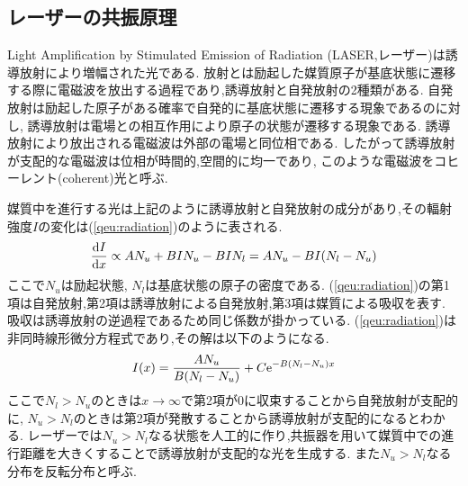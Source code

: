 \subsection{レーザーの共振原理}
Light Amplification by Stimulated Emission of Radiation (LASER,レーザー)は誘導放射により増幅された光である.
放射とは励起した媒質原子が基底状態に遷移する際に電磁波を放出する過程であり,誘導放射と自発放射の2種類がある.
自発放射は励起した原子がある確率で自発的に基底状態に遷移する現象であるのに対し,
誘導放射は電場との相互作用により原子の状態が遷移する現象である.
誘導放射により放出される電磁波は外部の電場と同位相である.
したがって誘導放射が支配的な電磁波は位相が時間的,空間的に均一であり,
このような電磁波をコヒーレント(coherent)光と呼ぶ.

媒質中を進行する光は上記のように誘導放射と自発放射の成分があり,その輻射強度$I$の変化は(\ref{qeu:radiation})のように表される.
\begin{align}
  \label{qeu:radiation}
  \frac{{\rm d}I}{{\rm d}x}\propto AN_u+BIN_u-BIN_l=AN_u-BI(N_l-N_u)
\end{align}
ここで$N_u$は励起状態, $N_l$は基底状態の原子の密度である.
(\ref{qeu:radiation})の第1項は自発放射,第2項は誘導放射による自発放射,第3項は媒質による吸収を表す.
吸収は誘導放射の逆過程であるため同じ係数が掛かっている.
(\ref{qeu:radiation})は非同時線形微分方程式であり,その解は以下のようになる.
\begin{align}
  I(x)=\frac{AN_u}{B(N_l-N_u)}+C{\rm e}^{-B(N_l-N_u)x}
\end{align}
ここで$N_l>N_u$のときは$x\rightarrow\infty$で第2項が0に収束することから自発放射が支配的に,
$N_u>N_l$のときは第2項が発散することから誘導放射が支配的になるとわかる.
レーザーでは$N_u>N_l$なる状態を人工的に作り,共振器を用いて媒質中での進行距離を大きくすることで誘導放射が支配的な光を生成する.
また$N_u>N_l$なる分布を反転分布と呼ぶ.


